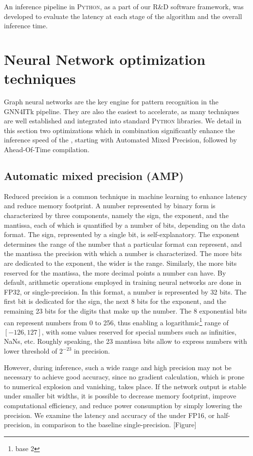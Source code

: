 An inference pipeline in \textsc{Python}, as a part of our \textsc{R\&D} software framework, was developed to evaluate the latency at each stage of the algorithm and the overall inference time.

\section{Neural Network optimization techniques}
\label{sect:opt-techniques}
Graph neural networks are the key engine for pattern recognition in the GNN4ITk pipeline. 
They are also the easiest to accelerate, as many techniques are well established and integrated into standard \textsc{Python} libraries. 
We detail in this section two optimizations which in combination significantly enhance the inference speed of the \ignn, starting with Automated Mixed Precision, followed by Ahead-Of-Time compilation.

\subsection{Automatic mixed precision (AMP)}
Reduced precision is a common technique in machine learning to enhance latency and reduce memory footprint.
A number represented by binary form is characterized by three components, namely the sign, the exponent, and the mantissa, each of which is quantified by a number of bits, depending on the data format. 
The sign, represented by a single bit, is self-explanatory. 
The exponent determines the range of the number that a particular format can represent, and the mantissa the precision with which a number is characterized. 
The more bits are dedicated to the exponent, the wider is the range.
Similarly, the more bits reserved for the mantissa, the more decimal points a number can have.
By default, arithmetic operations employed in training neural networks are done in FP32, or single-precision.
In this format, a number is represented by 32 bits. 
The first bit is dedicated for the sign, the next 8 bits for the exponent, and the remaining 23 bits for the digits that make up the number. 
The 8 exponential bits can represent numbers from 0 to 256, thus enabling a logarithmic\footnote{base 2} range of $[-126, 127]$, with some values reserved for special numbers such as infinities, NaNs, etc.
Roughly speaking, the 23 mantissa bits allow to express numbers with lower threshold of $2^{-23}$ in precision.

However, during inference, such a wide range and high precision may not be necessary to achieve good accuracy, since no gradient calculation, which is prone to numerical explosion and vanishing, takes place. 
If the network output is stable under smaller bit widths, it is possible to decrease memory footprint, improve computational efficiency, and reduce power consumption by simply lowering the precision. 
We examine the latency and accuracy of the \ignn under FP16, or half-precision, in comparison to the baseline single-precision.
[Figure]



